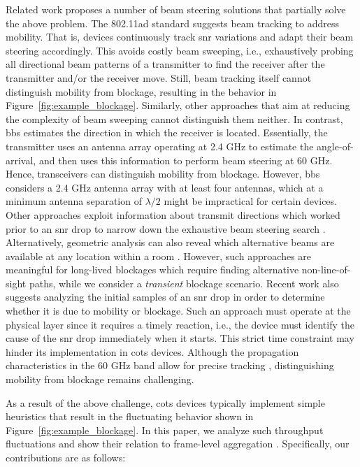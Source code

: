 \documentclass{article}
\begin{document}
Related work proposes a number of beam steering solutions that partially solve the above problem. The 802.11ad standard suggests beam tracking to address mobility. That is, devices continuously track \ac{snr} variations and adapt their beam steering accordingly. This avoids costly beam sweeping, i.e., exhaustively probing all directional beam patterns of a transmitter to find the receiver after the transmitter and/or the receiver move. Still, beam tracking itself cannot distinguish mobility from blockage, resulting in the behavior in Figure~\ref{fig:example_blockage}. Similarly, other approaches that aim at reducing the complexity of beam sweeping \cite{opt_beam_sweep} cannot distinguish them neither. In contrast, \ac{bbs} \cite{bbs} estimates the direction in which the receiver is located. Essentially, the transmitter uses an antenna array operating at 2.4 GHz to estimate the angle-of-arrival, and then uses this information to perform beam steering at 60 GHz. Hence, transceivers can distinguish mobility from blockage. However, \ac{bbs} considers a 2.4 GHz antenna array with at least four antennas, which at a minimum antenna separation of $\lambda/2$ might be impractical for certain devices. Other approaches exploit information about transmit directions which worked prior to an \ac{snr} drop to narrow down the exhaustive beam steering search \cite{mobiwac}. Alternatively, geometric analysis can also reveal which alternative beams are available at any location within a room \cite{beamscope}. However, such approaches are meaningful for long-lived blockages which require finding alternative non-line-of-sight paths, while we consider a \emph{transient} blockage scenario. Recent work \cite{wimi} also suggests analyzing the initial samples of an \ac{snr} drop in order to determine whether it is due to mobility or blockage. Such an approach must operate at the physical layer since it requires a timely reaction, i.e., the device must identify the cause of the \ac{snr} drop immediately when it starts. This strict time constraint  may hinder its implementation in \ac{cots} devices. Although the propagation characteristics in the 60 GHz band allow for precise tracking \cite{mtrack}, distinguishing mobility from blockage remains challenging.

As a result of the above challenge, \ac{cots} devices typically implement simple heuristics that result in the fluctuating behavior shown in Figure~\ref{fig:example_blockage}. In this paper, we analyze such throughput fluctuations and show their relation to frame-level aggregation \cite{aggregation_overview}. Specifically, our contributions are as follows:
\end{document}

